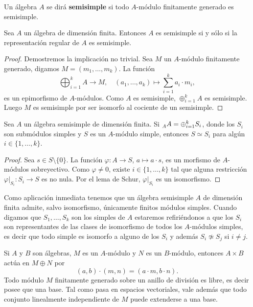 \begin{definition}
Un álgebra $A$ se dirá \textbf{semisimple} si todo $A$-módulo finitamente generado es semisimple. 
\end{definition}

\begin{proposition}
Sea $A$ un álgebra de dimensión finita. Entonces $A$ es semisimple si y sólo si la representación
regular de $A$ es semisimple.
\end{proposition}

\begin{proof}
Demostremos la implicación no trivial. Sea $M$ un $A$-módulo finitamente generado, digamos $M=(m_1,\dots,m_k)$. 
La función 
\[
\bigoplus_{i=1}^k A\to M,\quad
(a_1,\dots,a_k)\mapsto \sum_{i=1}^k a_i\cdot m_i,
\]
es un epimorfismo de $A$-módulos. Como
$A$ es semisimple, $\oplus_{i=1}^kA$ es semisimple. 
Luego $M$ es semisimple por ser isomorfo al cociente de un semisimple. 
\end{proof}

\begin{theorem}
Sea $A$ un álgebra semisimple de dimensión finita. Si $\prescript{}{A}A=\oplus_{i=1}^k S_i$, donde los $S_i$ son submódulos simples y 
$S$ es un $A$-módulo simple, entonces $S\simeq S_i$ para algún $i\in\{1,\dots,k\}$. 
\end{theorem}

\begin{proof}
Sea $s\in S\setminus\{0\}$. La función $\varphi\colon A\to S$, $a\mapsto a\cdot s$, es un morfismo de $A$-módulos  
sobreyectivo. Como $\varphi\ne 0$, existe $i\in\{1,\dots,k\}$ tal que alguna restricción 
$\varphi|_{S_i}\colon S_i\to S$ es no nula. 
Por el lema de Schur, $\varphi|_{S_i}$ es un isomorfismo.  	
\end{proof}

Como aplicación inmediata tenemos que
un álgebra semisimple $A$ de dimensión finita admite, salvo isomorfismo, únicamente finitos módulos simples. Cuando digamos
que $S_1,\dots,S_k$ son los simples de $A$ estaremos refiriéndonos a que los $S_i$ son 
representantes de las clases de isomorfismo de todos los $A$-módulos simples, es decir 
que todo simple es isomorfo a alguno de los $S_i$ y además 
$S_i\not\simeq S_j$ si $i\ne j$. 

\medskip
Si $A$ y $B$ son álgebras, $M$ es un $A$-módulo y $N$ es un $B$-módulo, entonces
$A\times B$ actúa en $M\oplus N$ por
\[
(a,b)\cdot (m,n)=(a\cdot m,b\cdot n).
\]
Todo módulo $M$ finitamente generado sobre un anillo de división es libre, es decir
posee que una base. Tal como pasa en espacios vectoriales, vale además que
todo conjunto linealmente independiente de $M$ puede extenderse a una base.  

